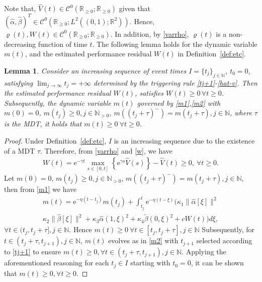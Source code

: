 \documentclass[letterpaper, 10 pt, conference]{ieeeconf}
\newtheorem{lemma}{Lemma}
\begin{document}
    Note that, $\hat V(t)\in \mathcal{C}^0(\mathbb{R}_{\geq0};\mathbb{R}_{\geq0})$ given that $(\hat \alpha,\hat \beta)^T\in \mathcal{C}^0(\mathbb{R}_{\geq0};L^2((0,1);\mathbb{R}^2))$. Hence, $\varrho(t), W(t)\in \mathcal{C}^0(\mathbb{R}_{\geq0};\mathbb{R}_{\geq0})$. In addition, by \eqref{varrho}, $\varrho(t)$ is a non-decreasing function of time $t$. The following lemma holds for the dynamic variable $m(t)$, and the estimated performance residual $W(t)$ in Definition~\ref{def:etc}.
\begin{lemma}
    Consider an increasing sequence of event times $I=\{t_j\}_{j\in\mathbb{N}}$, $t_0=0$, satisfying $\lim_{j\rightarrow\infty}t_j=+\infty$ determined by the triggering rule \eqref{tj+1}-\eqref{hat-v}. Then the estimated performance residual $W(t)$, satisfies $W(t)\geq0 \,\forall t\geq0$. Subsequently, the dynamic variable $m(t)$ governed by \eqref{m1},\eqref{m2} with $m(0)=0$, $m(t_j)\geq 0,j\in\mathbb{N}_{>0}$, $m((t_j+\tau)^-)=m(t_j+\tau),j\in\mathbb{N}$, where $\tau$ is the MDT, it holds that $m(t)\geq0~\forall t\geq0$.
\end{lemma}
\begin{proof}
    Under Definition~\ref{def:etc}, $I$ is an increasing sequence due to the existence of a MDT $\tau$. Therefore, from \eqref{varrho} and \eqref{w}, we have
    \begin{align*}
        W(t) = \mathrm{e}^{-\gamma t}\max_{s\in[0,t]}\left\{\mathrm{e}^{\gamma s}\hat V(s)\right\} - \hat V(t)\geq0,~\forall t\geq0.
    \end{align*}
    Let $m(0)=0$, $m(t_j)\geq 0,j\in\mathbb{N}_{>0}$, $m((t_j+\tau)^-)=m(t_j+\tau),j\in\mathbb{N}$, then from \eqref{m1} we have
    \begin{equation}
    \begin{aligned}
        m(t) = \mathrm{e}^{-\eta(t-t_j)}m(t_j) + \int_{t_j}^t \mathrm{e}^{-\eta(t -\xi)}\big(\kappa_1\|\hat\alpha[\xi]\|^2\\
        \kappa_2 \|\hat \beta[\xi]\|^2  + \kappa_3 \hat\alpha(1,\xi)^2+ \kappa_4 \tilde \beta(0,\xi)^2 + cW(t)\big)d\xi,
    \end{aligned}
    \end{equation}
    $\forall t\in(t_j,t_j+\tau], j\in\mathbb{N}$. Hence $m(t)\geq0~\forall t\in[t_j,t_j+\tau], j\in\mathbb{N}$ Subsequently, for $t\in(t_j+\tau,t_{j+1}), j\in\mathbb{N}$, $m(t)$ evolves as in \eqref{m2} with $t_{j+1}$ selected according to \eqref{tj+1} to ensure $m(t)\geq0,\forall t\in(t_j+\tau,t_{j+1}),j\in\mathbb{N}$. Applying the aforementioned reasoning for each $t_j\in I$ starting with $t_0=0$, it can be shown that $m(t)\geq0, \forall t\geq0$.
\end{proof}
\end{document}
